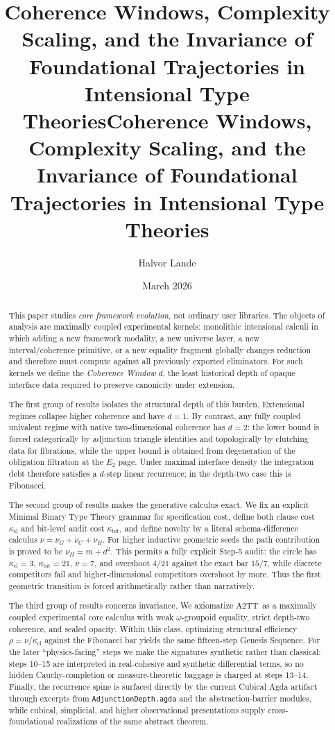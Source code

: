 \documentclass{lmcs}
\title[Coherence Windows and Foundational Trajectories]{Coherence Windows, Complexity Scaling, and the Invariance of Foundational Trajectories in Intensional Type Theories}
\title{Coherence Windows, Complexity Scaling, and the Invariance of Foundational Trajectories in Intensional Type Theories}
\author{Halvor Lande}
\date{March 2026}
\theoremstyle{plain}
\theoremstyle{definition}
\theoremstyle{remark}
\newcommand{\ATwo}{\ensuremath{\mathrm{A2TT}}}
\begin{document}
\maketitle

\begin{abstract}
This paper studies \emph{core framework evolution}, not ordinary user libraries.
The objects of analysis are maximally coupled experimental kernels: monolithic intensional calculi in which adding a new framework modality, a new universe layer, a new interval/coherence primitive, or a new equality fragment globally changes reduction and therefore must compute against all previously exported eliminators.
For such kernels we define the \emph{Coherence Window} $d$, the least historical depth of opaque interface data required to preserve canonicity under extension.

The first group of results isolates the structural depth of this burden.
Extensional regimes collapse higher coherence and have $d=1$.
By contrast, any fully coupled univalent regime with native two-dimensional coherence has $d=2$: the lower bound is forced categorically by adjunction triangle identities and topologically by clutching data for fibrations, while the upper bound is obtained from degeneration of the obligation filtration at the $E_2$ page.
Under maximal interface density the integration debt therefore satisfies a $d$-step linear recurrence; in the depth-two case this is Fibonacci.

The second group of results makes the generative calculus exact.
We fix an explicit Minimal Binary Type Theory grammar for specification cost, define both clause cost $\kappa_{\mathrm{cl}}$ and bit-level audit cost $\kappa_{\mathrm{bit}}$, and define novelty by a literal schema-difference calculus $\nu=\nu_G+\nu_C+\nu_H$.
For higher inductive geometric seeds the path contribution is proved to be $\nu_H=m+d^2$.
This permits a fully explicit Step-5 audit: the circle has $\kappa_{\mathrm{cl}}=3$, $\kappa_{\mathrm{bit}}=21$, $\nu=7$, and overshoot $4/21$ against the exact bar $15/7$, while discrete competitors fail and higher-dimensional competitors overshoot by more.
Thus the first geometric transition is forced arithmetically rather than narratively.

The third group of results concerns invariance.
We axiomatize \ATwo\ as a maximally coupled experimental core calculus with weak $\omega$-groupoid equality, strict depth-two coherence, and sealed opacity.
Within this class, optimizing structural efficiency $\rho=\nu/\kappa_{\mathrm{cl}}$ against the Fibonacci bar yields the same fifteen-step Genesis Sequence.
For the later ``physics-facing'' steps we make the signatures synthetic rather than classical: steps 10--15 are interpreted in real-cohesive and synthetic differential terms, so no hidden Cauchy-completion or measure-theoretic baggage is charged at steps 13--14.
Finally, the recurrence spine is surfaced directly by the current Cubical Agda artifact through excerpts from \texttt{AdjunctionDepth.agda} and the abstraction-barrier modules, while cubical, simplicial, and higher observational presentations supply cross-foundational realizations of the same abstract theorem.
\end{abstract}
\end{document}
